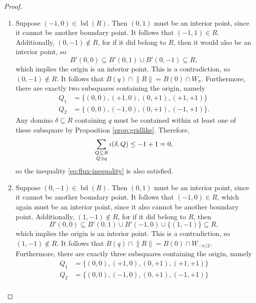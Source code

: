 \begin{proof}
\begin{enumerate}
      \item Suppose $(-1, 0) \in \operatorname{bd}(R)$. 
      Then $(0, 1)$ must be an interior point, since it cannot be another boundary point.
      It follows that $(-1, 1) \in R$. 
      Additionally, $(0, -1) \not\in R$, for if it did belong to $R$, then it would also be an interior point, so
      \begin{equation}
        B'(0, 0) \subseteq B'(0, 1) \cup B'(0, -1) \subseteq R,
      \end{equation}
      which implies the origin is an interior point.
      This is a contradiction, so $(0, -1) \not \in R$.
      It follows that $B(q) \cap \lVert R \rVert = B(0) \cap W_{\pi}$.
      Furthermore, there are exactly two subsquares containing the origin, namely
      \begin{align}
        Q_1 &= \{ (0, 0), (+1, 0), (0, +1), (+1, +1)\} \\
        Q_2 &= \{ (0, 0), (-1, 0), (0, +1), (-1, +1)\}.
      \end{align}
      Any domino $\delta \subseteq R$ containing $q$ must be contained within at least one of these subsquare by Proposition \ref{prop:gridlike}. Therefore,
      \begin{equation}
        \sum_{\substack{Q \mskip 1mu \subseteq \mskip 0.3mu R \\[0.2ex] Q \ni q}} \iota(\delta, Q) \leq -1 + 1 = 0,
      \end{equation}
      so the inequality \eqref{eq:flux-inequality} is also satisfied.
      \item Suppose $(0, -1) \in \operatorname{bd}(R)$. 
      Then $(0, 1)$ must be an interior point, since it cannot be another boundary point.
      It follows that $(-1, 0) \in R$, which again must be an interior point, since it also cannot be another boundary point.
      Additionally, $(1, -1) \not\in R$, for if it did belong to $R$, then
      \begin{equation}
        B'(0, 0) \subseteq B'(0, 1) \cup B'(-1, 0) \cup \{(1, -1)\} \subseteq R,
      \end{equation}
      which implies the origin is an interior point.
      This is a contradiction, so $(1, -1) \not \in R$.
      It follows that $B(q) \cap \lVert R \rVert = B(0) \cap W_{-\pi/2}$.
      Furthermore, there are exactly three subsquares containing the origin, namely
      \begin{align}
        Q_1 &= \{ (0, 0), (+1, 0), (0, +1), (+1, +1)\} \\
        Q_2 &= \{ (0, 0), (-1, 0), (0, +1), (-1, +1)\} \\

\end{align}
\end{enumerate}
\end{proof}
